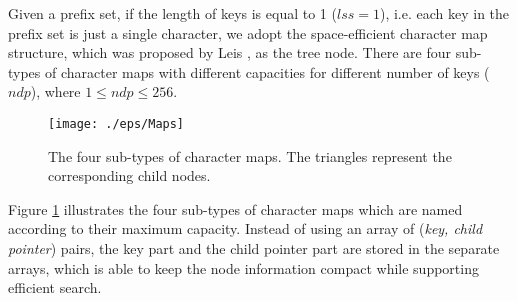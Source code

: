 \documentclass{article}
\begin{document}
Given a prefix set, if the length of keys is equal to 1 ($lss=1$),
i.e. each key in the prefix set is just a single character, we adopt
the space-efficient \textsf{character map} structure, which was
proposed by Leis \cite{Leis2013}, as the tree node. There are four
sub-types of character maps with different capacities for different
number of keys ($ndp$), where $1 \leq ndp \leq 256$.

\begin{figure}[htbp]
  \centering
  \texttt{[image: ./eps/Maps]}
  \caption{The four sub-types of character maps. The triangles
    represent the corresponding child nodes.}
  \label{fig:character map}
\end{figure}

Figure \ref{fig:character map} illustrates the four sub-types of
character maps which are named according to their maximum
capacity. Instead of using an array of (\emph{key, child pointer})
pairs, the key part and the child pointer part are stored in the
separate arrays, which is able to keep the node information compact
while supporting efficient search.
\end{document}
